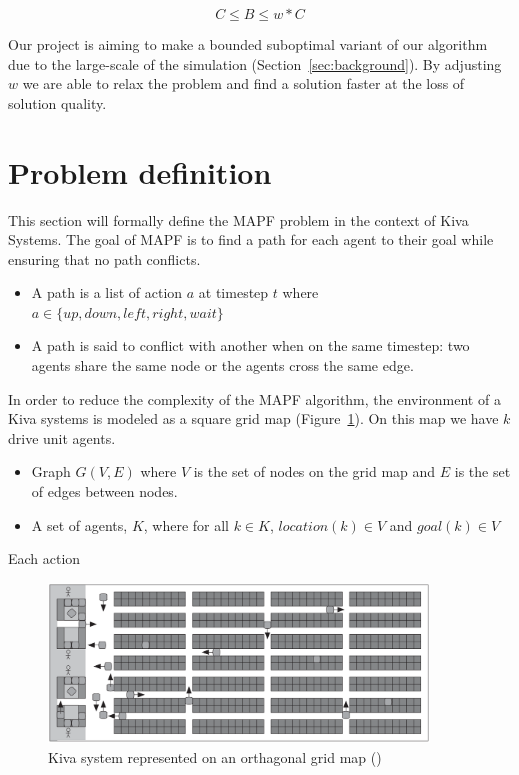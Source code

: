 \documentclass[a4paper,11pt]{article}
\begin{document}
\[C \le B \le w*C\]

Our project is aiming to make a bounded suboptimal variant of our algorithm due to the large-scale of the simulation (Section~\ref{sec:background}). By adjusting $w$ we are able to relax the problem and find a solution faster at the loss of solution quality.

\section{Problem definition}
This section will formally define the MAPF problem in the context of Kiva Systems. The goal of MAPF is to find a path for each agent to their goal while ensuring that no path conflicts. 

\begin{itemize}
	\item A path is a list of action $a$ at timestep $t$ where $a \in \{up, down, left, right, wait\}$
	\item A path is said to conflict with another when on the same timestep: two agents share the same node or the agents cross the same edge.
\end{itemize}

In order to reduce the complexity of the MAPF algorithm, the environment of a Kiva systems is modeled as a square grid map (Figure~\ref{fig:kivawarehouse}). On this map we have $k$ drive unit agents.

\begin{itemize}
	\item Graph $G(V, E)$ where $V$ is the set of nodes on the grid map and $E$ is the set of edges between nodes.
	\item A set of agents, $K$, where for all $k \in K$, $location(k) \in V$ and $goal(k) \in V$
\end{itemize}

Each action 

\begin{figure}[h]
	\centering
	\includegraphics[width=0.9\textwidth]{graphics/kivasystemlayout}
	\caption{Kiva system represented on an orthagonal grid map (\cite{wurman2008coordinating})}
	\label{fig:kivawarehouse}
\end{figure}
\end{document}
